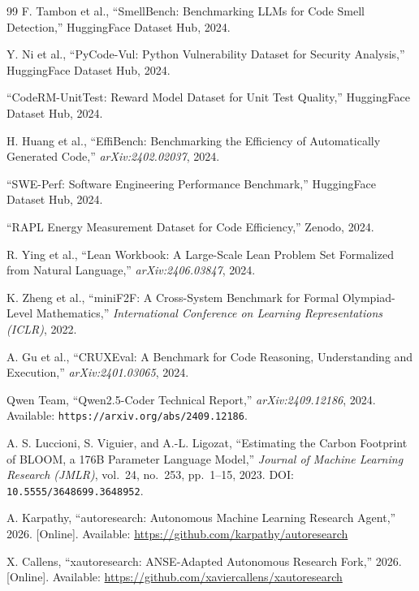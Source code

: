 \documentclass[conference]{IEEEtran}
\begin{document}
\begin{thebibliography}{99}
F. Tambon et al., ``SmellBench: Benchmarking LLMs for Code Smell Detection,''
HuggingFace Dataset Hub, 2024.

Y. Ni et al., ``PyCode-Vul: Python Vulnerability Dataset for Security Analysis,''
HuggingFace Dataset Hub, 2024.

``CodeRM-UnitTest: Reward Model Dataset for Unit Test Quality,''
HuggingFace Dataset Hub, 2024.

H. Huang et al., ``EffiBench: Benchmarking the Efficiency of Automatically Generated Code,''
\emph{arXiv:2402.02037}, 2024.

``SWE-Perf: Software Engineering Performance Benchmark,''
HuggingFace Dataset Hub, 2024.

``RAPL Energy Measurement Dataset for Code Efficiency,'' Zenodo, 2024.

R. Ying et al., ``Lean Workbook: A Large-Scale Lean Problem Set Formalized from Natural Language,''
\emph{arXiv:2406.03847}, 2024.

K. Zheng et al., ``miniF2F: A Cross-System Benchmark for Formal Olympiad-Level Mathematics,''
\emph{International Conference on Learning Representations (ICLR)}, 2022.

A. Gu et al., ``CRUXEval: A Benchmark for Code Reasoning, Understanding and Execution,''
\emph{arXiv:2401.03065}, 2024.

Qwen Team, ``Qwen2.5-Coder Technical Report,''
\emph{arXiv:2409.12186}, 2024.
Available: \texttt{https://arxiv.org/abs/2409.12186}.

A. S. Luccioni, S. Viguier, and A.-L. Ligozat,
``Estimating the Carbon Footprint of BLOOM, a 176B Parameter Language Model,''
\emph{Journal of Machine Learning Research (JMLR)}, vol.~24, no.~253, pp.~1--15, 2023.
DOI: \texttt{10.5555/3648699.3648952}.

A. Karpathy, ``autoresearch: Autonomous Machine Learning Research Agent,'' 2026.
[Online]. Available: \url{https://github.com/karpathy/autoresearch}

X. Callens, ``xautoresearch: ANSE-Adapted Autonomous Research Fork,'' 2026.
[Online]. Available: \url{https://github.com/xaviercallens/xautoresearch}

\end{thebibliography}
\end{document}
